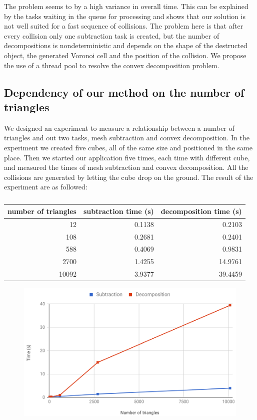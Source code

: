 The problem seems to by a high variance in overall time. This can be explained by the tasks waiting in the queue for processing and shows that our solution is not well suited for a fast sequence of collisions. The problem here is that after every collision only one subtraction task is created, but the number of decompositions is nondeterministic and depends on the shape of the destructed object, the generated Voronoi cell and the position of the collision. We propose the use of a thread pool to resolve the convex decomposition problem.

\subsection{Dependency of our method on the number of triangles}
We designed an experiment to measure a relationship between a number of triangles and out two tasks, mesh subtraction and convex decomposition. In the experiment we created five cubes, all of the same size and positioned in the same place. Then we started our application five times, each time with different cube, and measured the times of mesh subtraction and convex decomposition. All the collisions are generated by letting the cube drop on the ground. The result of the experiment are as followed:
\begin{table}
\centering
\begin{tabular}{r|r|r}
number of triangles & subtraction time (s) & decomposition time (s) \\
\hline
12 & 0.1138 & 0.2103 \\
108 & 0.2681 & 0.2401 \\
588 & 0.4069 & 0.9831 \\ 
2700 & 1.4255 & 14.9761 \\ 
10092 & 3.9377 & 39.4459 \\
\end{tabular}
\caption{}
\label{tab:subtraction-decomposition}
\end{table}

\begin{figure}
\centering
\includegraphics[width=\textwidth]{img/experiment-triangles}
\caption{}
\label{fig:subraction-decomposition}
\end{figure}


